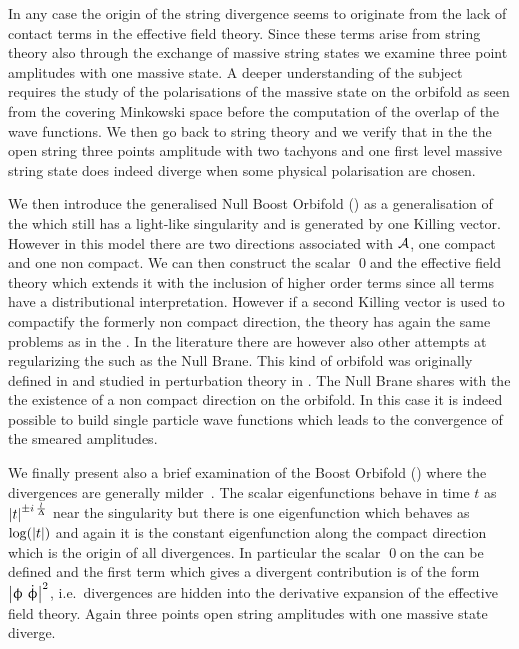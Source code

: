 In any case the origin of the string divergence seems to originate from the lack of contact terms in the effective field theory.
Since these terms arise from string theory also through the exchange of massive string states we examine three point amplitudes with one massive state.
A deeper understanding of the subject requires the study of the polarisations of the massive state on the orbifold as seen from the covering Minkowski space before the computation of the overlap of the wave functions.
We then go back to string theory and we verify that in the \nbo the open string three points amplitude with two tachyons and one first level massive string state does indeed diverge when some physical polarisation are chosen.

We then introduce the generalised Null Boost Orbifold (\gnbo) as a generalisation of the \nbo which still has a light-like singularity and is generated by one Killing vector.
However in this model there are two directions associated with $\mathcal{A}$, one compact and one non compact.
We can then construct the scalar \qed and the effective field theory which extends it with the inclusion of higher order terms since all terms have a distributional interpretation.
However if a second Killing vector is used to compactify the formerly non compact direction, the theory has again the same problems as in the \nbo.
In the literature there are however also other attempts at regularizing the \nbo such as the Null Brane.
This kind of orbifold was originally defined in \cite{Figueroa-OFarrill:2001:GeneralisedSupersymmetricFluxbranes,Cornalba:2004:TimedependentOrbifoldsString} and studied in perturbation theory in \cite{Liu:2002:StringsTimeDependentOrbifolds}.
The Null Brane shares with the \gnbo the existence of a non compact direction on the orbifold.
In this case it is indeed possible to build single particle wave functions which leads to the convergence of the smeared amplitudes.

We finally present also a brief examination of the Boost Orbifold (\bo) where the divergences are generally milder~\cite{Horowitz:1991:SingularStringSolutions}.
The scalar eigenfunctions behave in time $t$ as $\abs{t}^{\pm i\, \frac{l}{\Updelta}}$ near the singularity but there is one eigenfunction which behaves as $\log(\abs{t})$ and again it is the constant eigenfunction along the compact direction which is the origin of all divergences.
In particular the scalar \qed on the \bo can be defined and the first term which gives a divergent contribution is of the form $\abs{\upphi~\dot{\upphi}}^2$, i.e.\ divergences are hidden into the derivative expansion of the effective field theory.
Again three points open string amplitudes with one massive state diverge.

